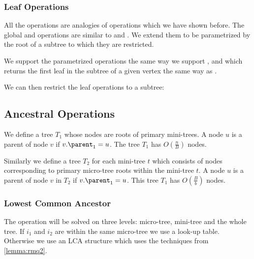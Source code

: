 \subsubsection{Leaf Operations}

All the \leafAny{} operations are analogies of operations which we have shown before.
The global \leafRank{} and \leafSelect{} operations are similar to \preRank{} and \preSelect{}.
We extend them to be parametrized by the root of a subtree to which they are restricted.

We support the parametrized operations \leafSize{} the same way we support \subtreeSize{}, and \leafFirst{} which returns the first leaf in the subtree of a given vertex the same way as \deepestVertex{}.

We can then restrict the leaf operations to a subtree:
\begin{algorithm}
\begin{algorithmic}
	\State {}
\EndFunction
\end{algorithmic}
\end{algorithm}

\begin{algorithm}
\begin{algorithmic}
	\State {}
\EndFunction
\end{algorithmic}
\end{algorithm}

\subsection{Ancestral Operations}

We define a tree $T_1$ whose nodes are roots of primary mini-trees.
A node $u$ is a parent of node $v$ if $v.\parent_1 = u$.
The tree $T_1$ has $O(\frac{n}{B})$ nodes.

Similarly we define a tree $T_2$ for each mini-tree $t$ which consists of nodes corresponding to primary micro-tree roots within the mini-tree $t$.
A node $u$ is a parent of node $v$ in $T_2$ if $v.\parent_1 = u$.
This tree $T_1$ has $O(\frac{B}{b})$ nodes.

\subsubsection{Lowest Common Ancestor}

The operation \lca{} will be solved on three levels: micro-tree, mini-tree and the whole tree.
If $i_1$ and $i_2$ are within the same micro-tree we use a look-up table.
Otherwise we use an LCA structure which uses the techniques from \ref{lemma:rmq2}.

